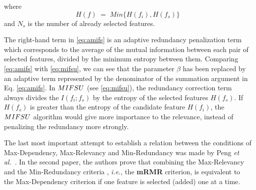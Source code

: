 \documentclass[a4paper,fleqn]{report}
\def\etal{{\em et al.\ }}
\def\ie{{\em i.e.}}
\begin{document}
where
\begin{equation}
H \left( f \right) \;=\;Min \{ H(f_i), H(f_s) \}
\end{equation}
and $N_s$ is the number of already selected features.

The right-hand term in \ref{eq:amifs} is an adaptive redundancy
penalization term which corresponds to the average of the mutual information
between each pair of selected features, divided by the minimum
entropy between them. Comparing \ref{eq:amifs} with  \ref{eq:mifsu}, we can see
that the parameter $\beta$ has been replaced by an adaptive term
represented by the denominator of the summation argument in Eq. \ref{eq:amifs}.
In $MIFS\-U$ (see \ref{eq:mifsu}), the redundancy correction term
always divides the $I(f_i; f_s)$ by the entropy of the selected
features $H(f_s)$. If $H(f_s)$ is greater than the entropy of the
candidate feature $H(f_i)$, the $MIFS\-U$ algorithm would give 
more importance to the relevance, instead of penalizing the
redundancy more strongly.

The last most important attempt to establish a relation between the conditions of Max-Dependency, Max-Relevancy and Min-Redundancy was made
by Peng \etal \cite{Peng2005a,Peng2005}. In the second paper, the authors prove that combining the Max-Relevancy and the Min-Redundancy criteria 
, \ie, the {\bf mRMR} criterion, is equivalent to the Max-Dependency criterion if one feature is selected (added) one at a time. 
\end{document}
